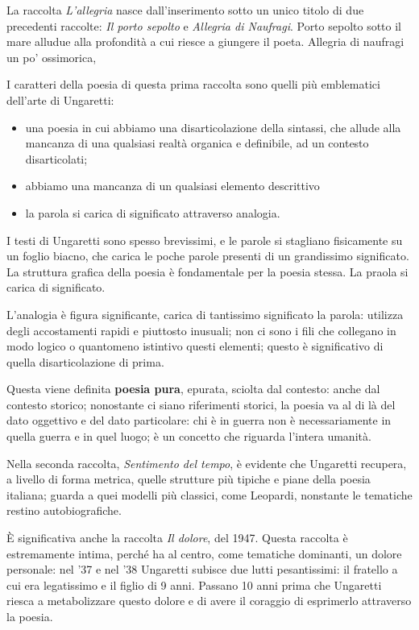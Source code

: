 \documentclass[a4paper, twoside, titlepage]{book}
\newcounter{mar}
\newcommand{\elenco}[1]{%
\begin{itemize}
#1
\end{itemize}}
\begin{document}
La raccolta \textit{L'allegria} nasce dall'inserimento sotto un unico titolo di due precedenti raccolte: \textit{Il porto sepolto} e \textit{Allegria di Naufragi}. Porto sepolto sotto il mare alludue alla profondità a cui riesce a giungere il poeta. Allegria di naufragi un po' ossimorica,

I caratteri della poesia di questa prima raccolta sono quelli più emblematici dell'arte di Ungaretti:

\elenco{
	\item una poesia in cui abbiamo una disarticolazione della sintassi, che allude alla mancanza di una qualsiasi realtà organica e definibile, ad un contesto disarticolati;
	\item abbiamo una mancanza di un qualsiasi elemento descrittivo
	\item la parola si carica di significato attraverso analogia.}

I testi di Ungaretti sono spesso brevissimi, e le parole si stagliano fisicamente su un foglio biacno, che carica le poche parole presenti di un grandissimo significato.
La struttura grafica della poesia è fondamentale per la poesia stessa. La praola si carica di significato.

L'analogia è figura significante, carica di tantissimo significato la parola: utilizza degli accostamenti rapidi e piuttosto inusuali; non ci sono i fili che collegano in modo logico o quantomeno istintivo questi elementi; questo è significativo di quella disarticolazione di prima.

Questa viene definita \textbf{poesia pura}, epurata, sciolta dal contesto: anche dal contesto storico; nonostante ci siano riferimenti storici, la poesia va al di là del dato oggettivo e del dato particolare: chi è in guerra non è necessariamente in quella guerra e in quel luogo; è un concetto che riguarda l'intera umanità. 

Nella seconda raccolta, \textit{Sentimento del tempo}, è evidente che Ungaretti recupera, a livello di forma metrica, quelle strutture più tipiche e piane della poesia italiana; guarda a quei modelli più classici, come Leopardi, nonstante le tematiche restino autobiografiche.

È significativa anche la raccolta \textit{Il dolore}, del 1947. Questa raccolta è estremamente intima, perché ha al centro, come tematiche dominanti, un dolore personale: nel '37 e nel '38 Ungaretti subisce due lutti pesantissimi: il fratello a cui era legatissimo e il figlio di 9 anni.
Passano 10 anni prima che Ungaretti riesca a metabolizzare questo dolore e di avere il coraggio di esprimerlo attraverso la poesia.
\end{document}
